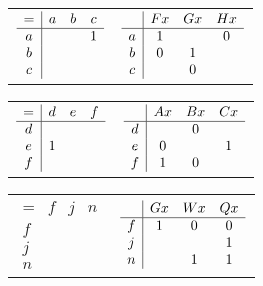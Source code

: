 \documentclass[PHIL101-Textbook.tex]{subfiles}
\begin{document}
\begin{earg}
\item \begin{tabular}{ll}
	$\begin{array}{c|ccc}
	   = & a & b & c\\ \hline
	   a & & &1\\
	   b & & \\
	   c
	 \end{array}$
		 & 
	$\begin{array}{c|ccc}
	   & \mathord{F}{x} & \mathord{G}{x} & \mathord{H}{x}\\ \hline
	   a & 1& &0\\
	   b & 0& 1\\
	   c & &0 &
	 \end{array}$
  \end{tabular}\medskip\medskip
\item \begin{tabular}{ll}
	$\begin{array}{c|ccc}
	   = & d & e & f\\ \hline
	   d & &\\
	   e & 1&& \\
	   f & &
	 \end{array}$
		 & 
	$\begin{array}{c|ccc}
	   & \mathord{A}{x} & \mathord{B}{x} & \mathord{C}{x}\\ \hline
	   d & &0\\
	   e & 0&&1 \\
	   f &1 &0
	 \end{array}$
  \end{tabular}\medskip\medskip
\item \begin{tabular}{ll}
	$\begin{array}{c|ccc}
	   = & f & j & n\\ \hline
	   f & &\\
	   j & & \\
	   n
	 \end{array}$
		 & 
	$\begin{array}{c|ccc}
	   & \mathord{G}{x} & \mathord{W}{x}& \mathord{Q}{x} \\ \hline
	   f & 1& 0 & 0 \\
	   j & & &1\\
	   n & &1 &1
	 \end{array}$
  \end{tabular}\medskip\medskip
\item \begin{tabular}{ll}

\end{tabular}
\end{earg}
\end{document}
